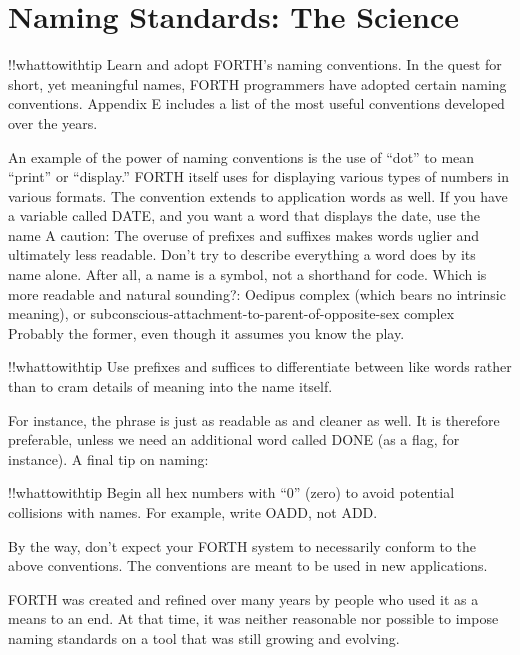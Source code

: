 \section{Naming Standards: The Science}

!!whattowithtip{
Learn and adopt FORTH's naming conventions.
}
In the quest for short, yet meaningful names, FORTH programmers
have adopted certain naming conventions.  Appendix E includes a list of
the most useful conventions developed over the years.

An example of the power of naming conventions is the use of ``dot''
to mean ``print'' or ``display.'' FORTH itself uses
for displaying various types of numbers in various formats.  The convention
extends to application words as well.  If you have a variable called
DATE, and you want a word that displays the date, use the name
A caution: The overuse of prefixes and suffixes makes words uglier and
ultimately less readable.  Don't try to describe everything a word does by
its name alone.  After all, a name is a symbol, not a shorthand for code.
Which is more readable and natural sounding?:
Oedipus complex
(which bears no intrinsic meaning), or
subconscious-attachment-to-parent-of-opposite-sex complex
Probably the former, even though it assumes you know the play.

!!whattowithtip{
Use prefixes and suffices to differentiate between like words rather than to
cram details of meaning into the name itself.
}

For instance, the phrase
is just as readable as
and cleaner as well.  It is therefore preferable, unless we need an additional
word called DONE (as a flag, for instance).
A final tip on naming:

!!whattowithtip{
Begin all hex numbers with ``0'' (zero) to avoid potential collisions with
names.
}
For example, write OADD, not ADD.

By the way, don't expect your FORTH system to necessarily conform
to the above conventions.  The conventions are meant to be used in
new applications.

FORTH was created and refined over many years by people who
used it as a means to an end.  At that time, it was neither reasonable nor
possible to impose naming standards on a tool that was still growing and
evolving.

